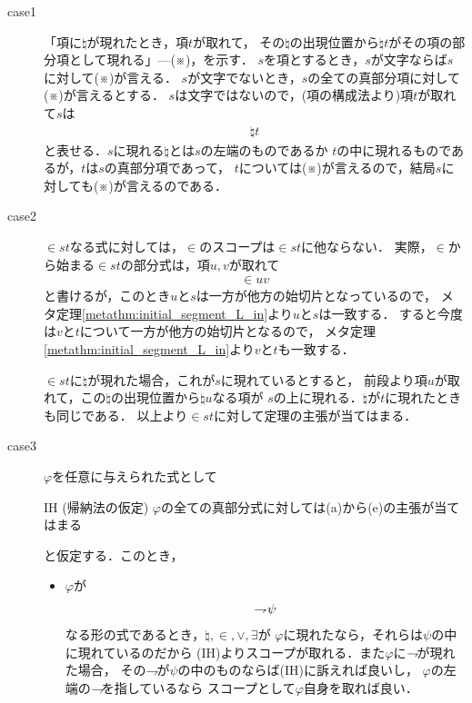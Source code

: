 	\begin{metaprf}\mbox{}
		\begin{description}
			\item[case1]
				「項に$\natural$が現れたとき，項$t$が取れて，
				その$\natural$の出現位置から$\natural t$がその項の部分項として現れる」---(※)，を示す．
				$s$を項とするとき，$s$が文字ならば$s$に対して(※)が言える．
				$s$が文字でないとき，$s$の全ての真部分項に対して(※)が言えるとする．
				$s$は文字ではないので，(項の構成法より)項$t$が取れて$s$は
				\begin{align}
					\natural t
				\end{align}
				と表せる．$s$に現れる$\natural$とは$s$の左端のものであるか
				$t$の中に現れるものであるが，$t$は$s$の真部分項であって，
				$t$については(※)が言えるので，結局$s$に対しても(※)が言えるのである．
			
			
			\item[case2]
				$\in s t$なる式に対しては，$\in$のスコープは$\in s t$に他ならない．
				実際，$\in$から始まる$\in s t$の部分式は，項$u,v$が取れて
				\begin{align}
					\in u v
				\end{align}
				と書けるが，このとき$u$と$s$は一方が他方の始切片となっているので，
				メタ定理\ref{metathm:initial_segment_L_in}より$u$と$s$は一致する．
				すると今度は$v$と$t$について一方が他方の始切片となるので，
				メタ定理\ref{metathm:initial_segment_L_in}より$v$と$t$も一致する．
				
				$\in s t$に$\natural$が現れた場合，これが$s$に現れているとすると，
				前段より項$u$が取れて，この$\natural$の出現位置から$\natural u$なる項が
				$s$の上に現れる．$\natural$が$t$に現れたときも同じである．
				以上より$\in s t$に対して定理の主張が当てはまる．
					
			\item[case3]
				$\varphi$を任意に与えられた式として
				\begin{itembox}[l]{IH (帰納法の仮定)}
					$\varphi$の全ての真部分式に対しては(a)から(e)の主張が当てはまる
				\end{itembox}
				と仮定する．このとき，
				\begin{itemize}
					\item $\varphi$が
						\begin{align}
							\rightharpoondown\hspace{-0.25em} \psi
						\end{align}
						なる形の式であるとき，$\natural,\in,\vee,\exists$が
						$\varphi$に現れたなら，それらは$\psi$の中に現れているのだから
						(IH)よりスコープが取れる．また$\varphi$に$\rightharpoondown\hspace{-0.25em}$が現れた場合，
						その$\rightharpoondown\hspace{-0.25em}$が$\psi$の中のものならば(IH)に訴えれば良いし，
						$\varphi$の左端の$\rightharpoondown\hspace{-0.25em}$を指しているなら
						スコープとして$\varphi$自身を取れば良い．
						

\end{itemize}
\end{description}
\end{metaprf}
